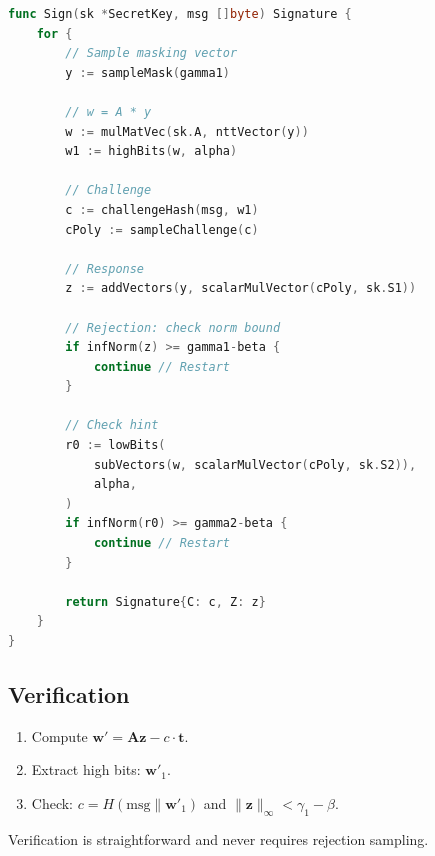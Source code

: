 \begin{lstlisting}[language=Go,caption={ML-DSA signing with rejection sampling}]
func Sign(sk *SecretKey, msg []byte) Signature {
    for {
        // Sample masking vector
        y := sampleMask(gamma1)

        // w = A * y
        w := mulMatVec(sk.A, nttVector(y))
        w1 := highBits(w, alpha)

        // Challenge
        c := challengeHash(msg, w1)
        cPoly := sampleChallenge(c)

        // Response
        z := addVectors(y, scalarMulVector(cPoly, sk.S1))

        // Rejection: check norm bound
        if infNorm(z) >= gamma1-beta {
            continue // Restart
        }

        // Check hint
        r0 := lowBits(
            subVectors(w, scalarMulVector(cPoly, sk.S2)),
            alpha,
        )
        if infNorm(r0) >= gamma2-beta {
            continue // Restart
        }

        return Signature{C: c, Z: z}
    }
}
\end{lstlisting}

\subsection{Verification}

\begin{enumerate}[nosep]
  \item Compute $\mathbf{w}' = \mathbf{A}\mathbf{z} - c \cdot \mathbf{t}$.
  \item Extract high bits: $\mathbf{w}'_1$.
  \item Check: $c = H(\text{msg} \| \mathbf{w}'_1)$ and $\|\mathbf{z}\|_\infty < \gamma_1 - \beta$.
\end{enumerate}

Verification is straightforward and never requires rejection sampling.

